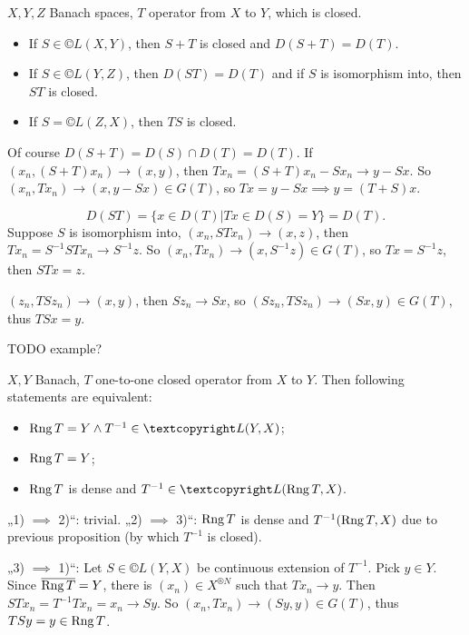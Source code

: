 \documentclass[12pt]{article}					%
\begin{document}
\begin{tvrzeni}
	$X, Y, Z$ Banach spaces, $T$ operator from $X$ to $Y$, which is closed.

	\begin{itemize}
		\item If $S \in ©L(X, Y)$, then $S + T$ is closed and $D(S + T) = D(T)$.
		\item If $S \in ©L(Y, Z)$, then $D(ST) = D(T)$ and if $S$ is isomorphism into, then $ST$ is closed.
		\item If $S = ©L(Z, X)$, then $TS$ is closed.
	\end{itemize}

	\begin{dukazin}
		Of course $D(S + T) = D(S) \cap D(T) = D(T)$. If $(x_n, (S + T) x_n) \rightarrow (x, y)$, then $T x_n = (S + T) x_n - S x_n \rightarrow y - Sx$. So $(x_n, T x_n) \rightarrow (x, y - S x) \in G(T)$, so $Tx = y - Sx \implies y = (T + S)x$.

		$$ D(ST) = \{x \in D(T) | Tx \in D(S) = Y\} = D(T). $$
		Suppose $S$ is isomorphism into, $(x_n, S Tx_n) \rightarrow (x, z)$, then $Tx_n = S^{-1}STx_n \rightarrow S^{-1}z$. So $(x_n, T x_n) \rightarrow (x, S^{-1} z) \in G(T)$, so $T x = S^{-1} z$, then $S T x = z$.

		$(z_n, T S z_n) \rightarrow (x, y)$, then $S z_n \rightarrow S x$, so $(S z_n, T S z_n) \rightarrow (S x, y) \in G(T)$, thus $T S x = y$.
	\end{dukazin}
\end{tvrzeni}


TODO example?

\begin{tvrzeni}
	$X, Y$ Banach, $T$ one-to-one closed operator from $X$ to $Y$. Then following statements are equivalent:

	\begin{itemize}
		\item $\Rang T = Y \land T^{-1} \in ©L(Y, X)$;
		\item $\operatorname{Rng} T = Y$;
		\item $\operatorname{Rng} T$ is dense and $T^{-1} \in ©L(\Rang T, X)$.
	\end{itemize}

	\begin{dukazin}
		„1) $\implies$ 2)“: trivial. „2) $\implies$ 3)“: $\operatorname{Rng} T$ is dense and $T^{-1}(\operatorname{Rng} T, X)$ due to previous proposition (by which $T^{-1}$ is closed).

		„3) $\implies$ 1)“: Let $S \in ©L(Y, X)$ be continuous extension of $T^{-1}$. Pick $y \in Y$. Since $\overline{\operatorname{Rng} T} = Y$, there is $(x_n) \in X^{®N}$ such that $T x_n \rightarrow y$. Then $S T x_n = T^{-1} T x_n = x_n \rightarrow S y$. So $(x_n, T x_n) \rightarrow (S y, y) \in G(T)$, thus $T S y = y \in \operatorname{Rng} T$.
	\end{dukazin}
\end{tvrzeni}
\end{document}
